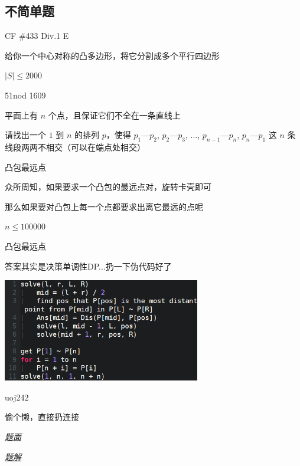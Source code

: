 \documentclass[UTF8]{beamer}
\begin{document}
		\subsection{不简单题}

			\begin{frame}{CF \#433 Div.1 E}

			给你一个中心对称的凸多边形，将它分割成多个平行四边形

			$|S| \le 2000$

			\end{frame}

			\begin{frame}{51nod 1609}

			平面上有 $n$ 个点，且保证它们不全在一条直线上

			请找出一个 $1$ 到 $n$ 的排列 $p$，使得 $p_1$---$p_2$, $p_2$---$p_3$, ..., $p_{n-1}$---$p_n$, $p_n$---$p_1$ 这 $n$ 条线段两两不相交（可以在端点处相交）

			\end{frame}

			\begin{frame}{凸包最远点}

			众所周知，如果要求一个凸包的最远点对，旋转卡壳即可

			那么如果要对凸包上每一个点都要求出离它最远的点呢

			$n \le 100000$

			\end{frame}

			\begin{frame}{凸包最远点}

			答案其实是决策单调性DP...扔一下伪代码好了

			\includegraphics[height=4.5cm]{dp.png}

			\end{frame}

			\begin{frame}{uoj242}

			偷个懒，直接扔连接

			\href{http://uoj.ac/problem/242}{\emph{\underline{题面}}}

			\href{http://c-sunshine.blog.uoj.ac/blog/2026}{\emph{\underline{题解}}}

			\end{frame}
\end{document}
